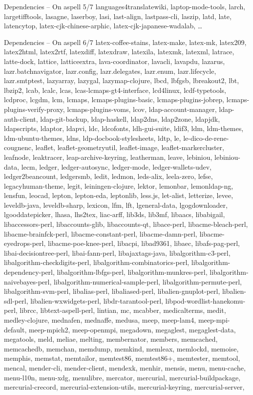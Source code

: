 \documentclass{beamer}
\begin{document}
\begin{frame}{Dependencies – On aspell 5/7}
languages4translatewiki, laptop-mode-tools, larch, largetifftools, lasagne, laserboy, lasi, last-align, lastpass-cli, laszip, latd, late, latencytop, latex-cjk-chinese-arphic, latex-cjk-japanese-wadalab, …
\end{frame}

\begin{frame}{Dependencies – On aspell 6/7}
\tiny latex-coffee-stains, latex-make, latex-mk, latex209, \alert{latex2html}, latex2rtf, latexdiff, latexdraw, latexila, latexmk, latexml, latrace, latte-dock, lattice, latticeextra, lava-coordinator, lavacli, lavapdu, lazarus, lazr.batchnavigator, lazr.config, lazr.delegates, lazr.enum, lazr.lifecycle, lazr.smtptest, lazyarray, lazygal, lazymap-clojure, lbcd, lbfgsb, lbreakout2, lbt, lbzip2, lcab, lcalc, lcas, lcas-lcmaps-gt4-interface, lcd4linux, lcdf-typetools, lcdproc, lcgdm, lcm, lcmaps, lcmaps-plugins-basic, lcmaps-plugins-jobrep, lcmaps-plugins-verify-proxy, lcmaps-plugins-voms, lcov, ldap-account-manager, ldap-auth-client, ldap-git-backup, ldap-haskell, ldap2dns, ldap2zone, ldapjdk, ldapscripts, ldaptor, ldapvi, ldc, ldcofonts, ldh-gui-suite, ldif3, ldm, ldm-themes, ldm-ubuntu-themes, ldns, ldp-docbook-stylesheets, ldtp, le, le-dico-de-rene-cougnenc, leaflet, leaflet-geometryutil, leaflet-image, leaflet-markercluster, leafnode, leaktracer, leap-archive-keyring, leatherman, leave, lebiniou, lebiniou-data, lecm, ledger, ledger-autosync, ledger-mode, ledger-wallets-udev, ledger2beancount, ledgersmb, ledit, ledmon, leds-alix, leela-zero, lefse, legacyhuman-theme, legit, leiningen-clojure, lektor, lemonbar, lemonldap-ng, lensfun, leocad, lepton, lepton-eda, leptonlib, less.js, let-alist, letterize, levee, leveldb-java, leveldb-sharp, lexicon, lfm, lft, lgeneral-data, lgogdownloader, lgooddatepicker, lhasa, lhs2tex, liac-arff, lib3ds, lib3mf, libaacs, libabigail, libaccessors-perl, libaccounts-glib, libaccounts-qt, libace-perl, libacme-bleach-perl, libacme-brainfck-perl, libacme-constant-perl, libacme-damn-perl, libacme-eyedrops-perl, libacme-poe-knee-perl, libacpi, libad9361, libaec, libafs-pag-perl, libai-decisiontree-perl, libai-fann-perl, libajaxtags-java, libalgorithm-c3-perl, libalgorithm-checkdigits-perl, libalgorithm-combinatorics-perl, libalgorithm-dependency-perl, libalgorithm-lbfgs-perl, libalgorithm-munkres-perl, libalgorithm-naivebayes-perl, libalgorithm-numerical-sample-perl, libalgorithm-permute-perl, libalgorithm-svm-perl, libalias-perl, libaliased-perl, libalien-gnuplot-perl, libalien-sdl-perl, libalien-wxwidgets-perl, libdr-tarantool-perl, libpod-wordlist-hanekomu-perl, librcc, \alert{libtext-aspell-perl}, lintian, mc, mcabber, medicalterms, medit, medley-clojure, mednafen, mednaffe, medusa, meep, meep-lam4, meep-mpi-default, meep-mpich2, meep-openmpi, megadown, megaglest, megaglest-data, megatools, meld, meliae, melting, membernator, members, memcached, memcachedb, memchan, memdump, memkind, memleax, memlockd, memoise, memphis, memstat, memtailor, memtest86, memtest86+, memtester, memtool, mencal, mender-cli, mender-client, mendexk, menhir, mensis, menu, menu-cache, menu-l10n, menu-xdg, menulibre, mercator, mercurial, mercurial-buildpackage, mercurial-crecord, mercurial-extension-utils, mercurial-keyring, mercurial-server, 
\end{frame}
\end{document}
